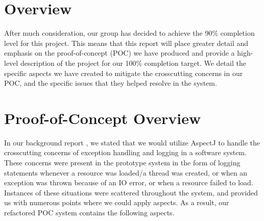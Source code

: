\documentclass[sigconf]{acmart}
\begin{document}
\section{Overview}
After much consideration, our group has decided to achieve the 90\% completion level for this project. This means that this report will place greater detail and emphasis on the proof-of-concept (POC) we have produced and provide a high-level description of the project for our 100\% completion target. We detail the specific aspects we have created to mitigate the crosscutting concerns in our POC, and the specific issues that they helped resolve in the system. 

\section{Proof-of-Concept Overview}
In our background report \cite{background-rept}, we stated that we would utilize AspectJ to handle the crosscutting concerns of exception handling and logging in a software system. These concerns were present in the prototype system in the form of logging statements whenever a resource was loaded/a thread was created, or when an exception was thrown because of an IO error, or when a resource failed to load. Instances of these situations were scattered throughout the system, and provided us with numerous points where we could apply aspects. As a result,  our refactored POC system contains the following aspects. 
\end{document}
